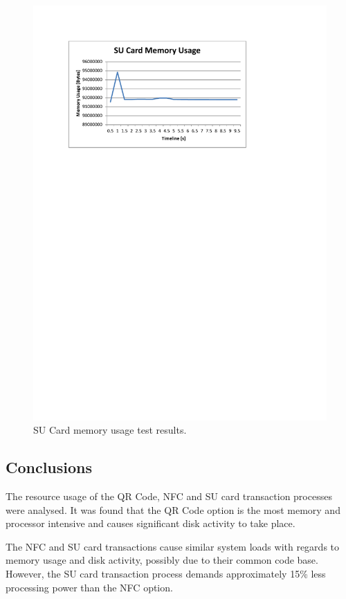 \begin{figure}
 \centering 
 \includegraphics[clip=true, trim = 0 550 80 70,
 scale=0.7]{su_test_mem}
 \caption{SU Card memory usage test results.}
 \label{fig:su_test_mem}
\end{figure}

\subsection{Conclusions}

The resource usage of the QR Code, NFC and SU card transaction processes were
analysed. It was found that the QR Code option is the most memory and processor
intensive and causes significant disk activity to take place. 

The NFC and SU card transactions cause similar system loads with regards to
memory usage and disk activity, possibly due to their common code base.
However, the SU card transaction process demands approximately 15\% less
processing power than the NFC option.

